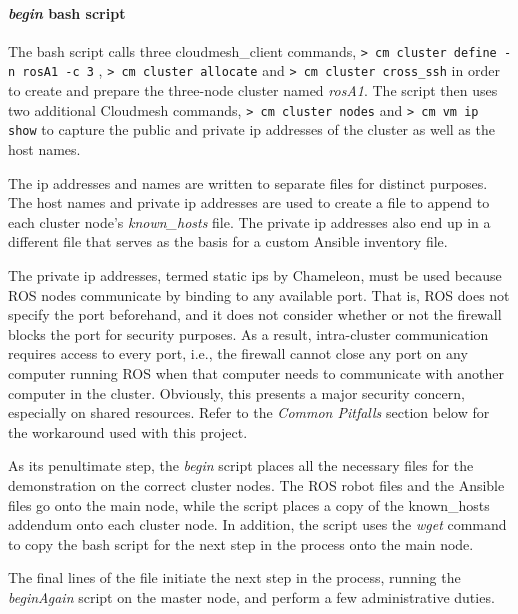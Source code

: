 \documentclass[9pt,twocolumn,twoside]{../../styles/osajnl}
\begin{document}
\paragraph{\textit{begin} bash script}
The bash script calls three cloudmesh\_client commands, {\color{green} \lstinline[style=BashInputStyle]!> cm cluster define -n rosA1 -c 3! }, {\color{green} \lstinline[style=BashInputStyle]!> cm cluster allocate! } and {\color{green} \lstinline[style=BashInputStyle]!> cm cluster cross_ssh! } in order to create and prepare the three-node cluster named \textit{rosA1}.  The script then uses two additional Cloudmesh commands, {\color{green} \lstinline[style=BashInputStyle]!> cm cluster nodes! } and {\color{green} \lstinline[style=BashInputStyle]!> cm vm ip show! } to capture the public and private ip addresses of the cluster as well as the host names.  

The ip addresses and names are written to separate files for distinct purposes.  The host names and private ip addresses are used to create a file to append to each cluster node's \textit{known\_hosts} file.  The private ip addresses also end up in a different file that serves as the basis for a custom Ansible inventory file.  

The private ip addresses, termed static ips by Chameleon, must be used because ROS nodes communicate by binding to any available port.  That is, ROS does not specify the port beforehand, and it does not consider whether or not the firewall blocks the port for security purposes.  As a result, intra-cluster communication requires access to every port, i.e., the firewall cannot close any port on any computer running ROS when that computer needs to communicate with another computer in the cluster.  Obviously, this presents a major security concern, especially on shared resources. Refer to the \textit{Common Pitfalls} section below for the workaround used with this project.

As its penultimate step, the \textit{begin} script places all the necessary files for the demonstration on the correct cluster nodes.  The ROS robot files and the Ansible files go onto the main node, while the script places a copy of the known\_hosts addendum onto each cluster node.  In addition, the script uses the \textit{wget} command to copy the bash script for the next step in the process onto the main node.

The final lines of the file initiate the next step in the process, running the \textit{beginAgain} script on the master node, and perform a few administrative duties.
\end{document}
